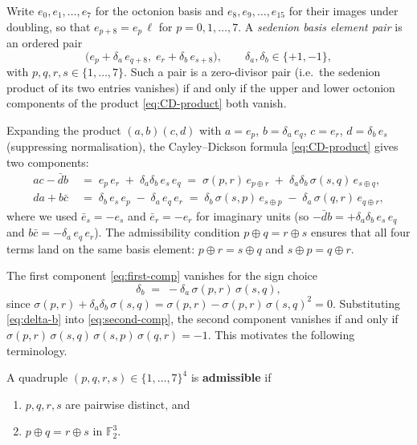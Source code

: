 Write $e_0,e_1,\dots,e_7$ for the octonion basis and
$e_8,e_9,\dots,e_{15}$ for their images under doubling, so that
$e_{p+8} = e_p\,\ell$ for $p=0,1,\dots,7$.  A \emph{sedenion basis
element pair} is an ordered pair
\[
  \bigl(e_p + \delta_a\,e_{q+8},\;
        e_r + \delta_b\,e_{s+8}\bigr),
  \qquad \delta_a,\delta_b\in\{+1,-1\},
\]
with $p,q,r,s\in\{1,\dots,7\}$.  Such a pair is a zero-divisor pair
(i.e.\ the sedenion product of its two entries vanishes) if and only if
the upper and lower octonion components of the product
\eqref{eq:CD-product} both vanish.

Expanding the product $(a,b)(c,d)$ with $a = e_p$, $b = \delta_a\,e_q$,
$c = e_r$, $d = \delta_b\,e_s$ (suppressing normalisation), the
Cayley--Dickson formula \eqref{eq:CD-product} gives two components:
\begin{align}
  ac - \bar{d}b \;&=\; e_p\,e_r \;+\;
    \delta_a\delta_b\,e_s\,e_q
    \;=\; \sigma(p,r)\,e_{p\oplus r}
    \;+\; \delta_a\delta_b\,\sigma(s,q)\,e_{s\oplus q},
    \label{eq:first-comp}\\
  da + b\bar{c} \;&=\; \delta_b\,e_s\,e_p \;-\;
    \delta_a\,e_q\,e_r
    \;=\; \delta_b\,\sigma(s,p)\,e_{s\oplus p}
    \;-\; \delta_a\,\sigma(q,r)\,e_{q\oplus r},
    \label{eq:second-comp}
\end{align}
where we used $\bar{e}_s = -e_s$ and $\bar{e}_r = -e_r$ for imaginary
units (so $-\bar{d}b = +\delta_a\delta_b\,e_s\,e_q$ and $b\bar{c} =
-\delta_a\,e_q\,e_r$).  The admissibility condition $p\oplus q = r\oplus
s$ ensures that all four terms land on the same basis element: $p\oplus r =
s\oplus q$ and $s\oplus p = q\oplus r$.

The first component \eqref{eq:first-comp} vanishes for the sign choice
\begin{equation}\label{eq:delta-b}
  \delta_b \;=\; -\delta_a\,\sigma(p,r)\,\sigma(s,q),
\end{equation}
since $\sigma(p,r) + \delta_a\delta_b\,\sigma(s,q) = \sigma(p,r) -
\sigma(p,r)\,\sigma(s,q)^2 = 0$.  Substituting \eqref{eq:delta-b} into
\eqref{eq:second-comp}, the second component vanishes if and only if
$\sigma(p,r)\,\sigma(s,q)\,\sigma(s,p)\,\sigma(q,r) = -1$.  This motivates
the following terminology.

\begin{definition}\label{def:admissible}
A quadruple $(p,q,r,s)\in\{1,\dots,7\}^4$ is \textbf{admissible} if
\begin{enumerate}
\item[\textup{(i)}] $p,q,r,s$ are pairwise distinct, and
\item[\textup{(ii)}] $p\oplus q = r\oplus s$ in $\mathbb{F}_2^3$.
\end{enumerate}
\end{definition}

